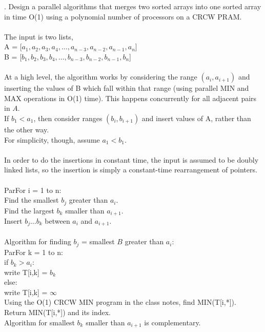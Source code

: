 \documentclass[10pt]{article}
\newcommand{\tab}{\hspace*{2em}}
\newcommand{\tabb}{\hspace*{4em}}
\begin{document}
. Design a parallel algorithms that merges two sorted arrays into one sorted array in time O(1) using a
polynomial number of processors on a CRCW PRAM.\\
\\
The input is two lists,\\
A = [$a_1, a_2, a_3, a_4, \ldots, a_{n-3}, a_{n-2}, a_{n-1}, a_n$]\\
B = [$b_1, b_2, b_3, b_4, \ldots, b_{n-3}, b_{n-2}, b_{n-1}, b_n$]\\
\\
At a high level, the algorithm works by considering the range $(a_i, a_{i+1})$ and inserting the values
of B which fall within that range (using parallel MIN and MAX operations in O(1) time). This happens
concurrently for all adjacent pairs in $A$.\\
If $b_1 < a_1$, then consider ranges $(b_i, b_{i+1})$ and insert values of A, rather than the other way.\\
For simplicity, though, assume $a_1 < b_1$.\\
\\
In order to do the insertions in constant time, the input is assumed to be doubly linked lists, so
the insertion is simply a constant-time rearrangement of pointers.\\
\\
ParFor i = 1 to n:\\
\tab Find the smallest $b_j$ greater than $a_i$.\\
\tab Find the largest $b_k$ smaller than $a_{i+1}$.\\
\tab Insert $b_j \ldots b_k$ between $a_i$ and $a_{i+1}$.\\
\\
Algorithm for finding $b_j$ = smallest $B$ greater than $a_i$:\\
ParFor k = 1 to n:\\
\tab if $b_k > a_i$:\\
\tabb write T[i,k] = $b_k$\\
\tab else:\\
\tabb write T[i,k] = $\infty$\\
\tab Using the O(1) CRCW MIN program in the class notes, find MIN(T[i,*]).\\
\tab Return MIN(T[i,*]) and its index.\\
Algorithm for smallest $b_k$ smaller than $a_{i+1}$ is complementary.\\
\end{document}
